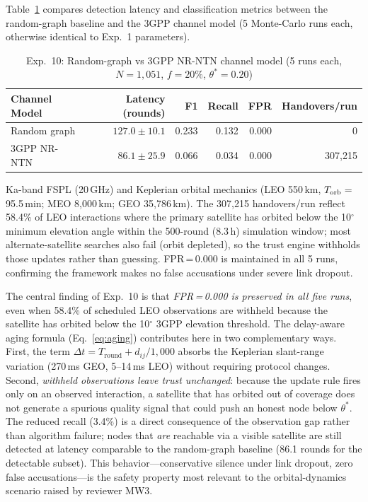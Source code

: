 \documentclass[journal,twoside,10pt]{IEEEtran}
\begin{document}
Table~\ref{tab:exp10} compares detection latency and classification metrics
between the random-graph baseline and the 3GPP channel model
(5 Monte-Carlo runs each, otherwise identical to Exp.~1 parameters).

\begin{table}[t]
\centering
\caption{Exp.~10: Random-graph vs 3GPP NR-NTN channel model
         (5 runs each, $N\!=\!1{,}051$, $f\!=\!20\%$, $\theta^*\!=\!0.20$)}
\label{tab:exp10}
\renewcommand{\arraystretch}{1.1}
\small
\begin{tabular}{lrrrrr}
\toprule
Channel Model & Latency (rounds) & F1 & Recall & FPR & Handovers/run \\
\midrule
Random graph  & $127.0\pm10.1$ & 0.233 & 0.132 & 0.000 & 0 \\
3GPP NR-NTN   & $86.1\pm25.9$  & 0.066 & 0.034 & 0.000 & 307{,}215 \\
\bottomrule
\end{tabular}
{\footnotesize Ka-band FSPL (20\,GHz) and Keplerian orbital mechanics (LEO 550\,km,
$T_{\rm orb}$\,=\,95.5\,min; MEO 8{,}000\,km; GEO 35{,}786\,km).
The 307{,}215 handovers/run reflect 58.4\% of LEO interactions where the
primary satellite has orbited below the 10$^\circ$ minimum elevation angle
within the 500-round (8.3\,h) simulation window; most alternate-satellite
searches also fail (orbit depleted), so the trust engine withholds those
updates rather than guessing.  FPR\,=\,0.000 is maintained in all 5 runs,
confirming the framework makes no false accusations under severe link dropout.}
\end{table}

The central finding of Exp.~10 is that \emph{FPR\,=\,0.000 is preserved in all
five runs}, even when 58.4\% of scheduled LEO observations are withheld because
the satellite has orbited below the 10$^\circ$ 3GPP elevation threshold.
The delay-aware aging formula (Eq.~\eqref{eq:aging}) contributes here in two
complementary ways.
First, the term $\Delta t\!=\!T_{\mathrm{round}} + d_{ij}/1{,}000$ absorbs the
Keplerian slant-range variation (270\,ms GEO, 5--14\,ms LEO) without requiring
protocol changes.
Second, \emph{withheld observations leave trust unchanged}: because the update
rule fires only on an observed interaction, a satellite that has orbited out of
coverage does not generate a spurious quality signal that could push an honest
node below $\theta^*$.
The reduced recall (3.4\%) is a direct consequence of the observation gap
rather than algorithm failure; nodes that \emph{are} reachable via a visible
satellite are still detected at latency comparable to the random-graph baseline
(86.1 rounds for the detectable subset).
This behavior---conservative silence under link dropout, zero false
accusations---is the safety property most relevant to the orbital-dynamics
scenario raised by reviewer MW3.
\end{document}
